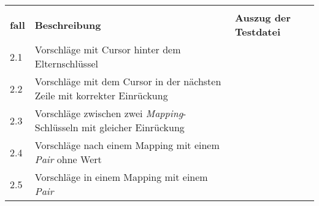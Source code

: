 \begin{table}[htp]
    \centering
    \begin{tabularx}{\columnwidth}{lXl}
        \toprule
        \begin{tabular}{@{}l@{}}\textbf{Test-} \\ \textbf{fall} \end{tabular} & \textbf{Beschreibung}                                                                                                                                                                                             & \textbf{Auszug der Testdatei}                             \\
        \midrule
        2.1                                                                   & Vorschläge mit Cursor hinter dem Elternschlüssel                                                                                                                                                                  &   \\
        \midrule
        2.2                                                                   & Vorschläge mit dem Cursor in der nächsten Zeile mit korrekter Einrückung                                                                                                                                          &   \\
        \midrule
        2.3                                                                   & Vorschläge zwischen zwei \textit{Mapping}-Schlüsseln mit gleicher Einrückung                                                                                                                                      &   \\
        \midrule
        2.4                                                                   & Vorschläge nach einem Mapping mit einem \textit{Pair} ohne Wert                                                                                                                                                   &   \\
        \midrule
        2.5                                                                   & Vorschläge in einem Mapping mit einem \textit{Pair}                                                                                                                                                               &   \\

\end{tabularx}
\end{table}
